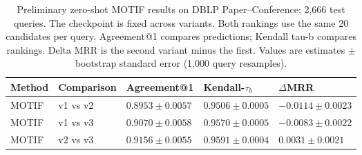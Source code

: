 \begin{table}[htbp]
\centering
\small
\renewcommand{\arraystretch}{1.15}
\setlength{\tabcolsep}{5pt}
\begin{adjustbox}{max width=\linewidth}
\begin{tabular}{|l|l|l|l|l|}
\hline
\textbf{Method} & \textbf{Comparison} & \textbf{Agreement@1} & \textbf{Kendall-$\tau_b$} & \textbf{$\Delta$MRR} \\
\hline
MOTIF & v1 vs v2 & $0.8953 \pm 0.0057$ & $0.9506 \pm 0.0005$ & $-0.0114 \pm 0.0023$ \\
\hline
MOTIF & v1 vs v3 & $0.9070 \pm 0.0058$ & $0.9570 \pm 0.0005$ & $-0.0083 \pm 0.0022$ \\
\hline
MOTIF & v2 vs v3 & $0.9156 \pm 0.0055$ & $0.9591 \pm 0.0004$ & $0.0031 \pm 0.0021$ \\
\hline
\end{tabular}
\end{adjustbox}
\caption{Preliminary zero-shot MOTIF results on DBLP Paper--Conference; 2,666 test queries. The checkpoint is fixed across variants. Both rankings use the same 20 candidates per query. Agreement@1 compares predictions; Kendall tau-b compares rankings. Delta MRR is the second variant minus the first. Values are estimates $\pm$ bootstrap standard error (1,000 query resamples).}
\label{tab:motif-dblp-paper-conference-invariance}
\end{table}
